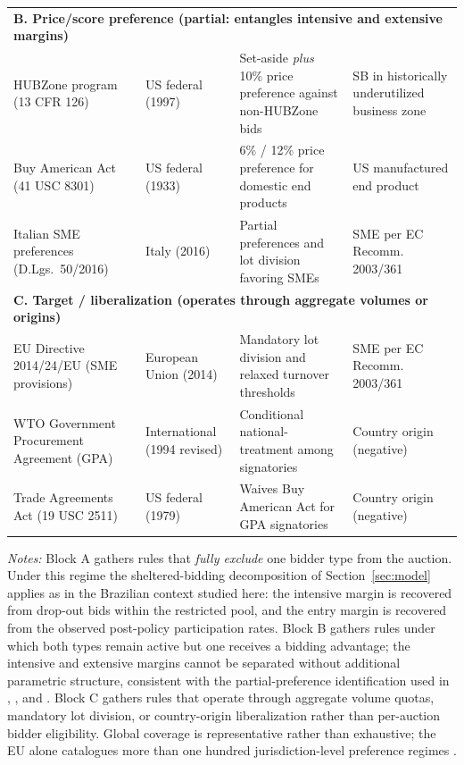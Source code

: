 \begin{table}[p]
\begin{threeparttable}
\begin{tabular}{p{4.8cm}p{2.6cm}p{3.2cm}p{3.6cm}}
\midrule
\multicolumn{4}{l}{\textbf{B. Price/score preference (partial: entangles intensive and extensive margins)}} \\
HUBZone program (13 CFR 126) & US federal (1997) & Set-aside \emph{plus} 10\% price preference against non-HUBZone bids & SB in historically underutilized business zone \\
Buy American Act (41 USC 8301) & US federal (1933) & 6\% / 12\% price preference for domestic end products & US manufactured end product \\
Italian SME preferences (D.Lgs.\ 50/2016) & Italy (2016) & Partial preferences and lot division favoring SMEs & SME per EC Recomm. 2003/361 \\
\midrule
\multicolumn{4}{l}{\textbf{C. Target / liberalization (operates through aggregate volumes or origins)}} \\
EU Directive 2014/24/EU (SME provisions) & European Union (2014) & Mandatory lot division and relaxed turnover thresholds & SME per EC Recomm. 2003/361 \\
WTO Government Procurement Agreement (GPA) & International (1994 revised) & Conditional national-treatment among signatories & Country origin (negative) \\
Trade Agreements Act (19 USC 2511) & US federal (1979) & Waives Buy American Act for GPA signatories & Country origin (negative) \\
\bottomrule
\end{tabular}
\begin{tablenotes}
\footnotesize
\item \textit{Notes:} Block A gathers rules that \emph{fully exclude} one bidder type from the auction. Under this regime the sheltered-bidding decomposition of Section~\ref{sec:model} applies as in the Brazilian context studied here: the intensive margin is recovered from drop-out bids within the restricted pool, and the entry margin is recovered from the observed post-policy participation rates. Block B gathers rules under which both types remain active but one receives a bidding advantage; the intensive and extensive margins cannot be separated without additional parametric structure, consistent with the partial-preference identification used in \citet{marion2007}, \citet{krasnokutskaya2011}, and \citet{atheyseira2011}. Block C gathers rules that operate through aggregate volume quotas, mandatory lot division, or country-origin liberalization rather than per-auction bidder eligibility. Global coverage is representative rather than exhaustive; the EU alone catalogues more than one hundred jurisdiction-level preference regimes \citep{bosio2022}.
\end{tablenotes}
\end{threeparttable}
\end{table}
